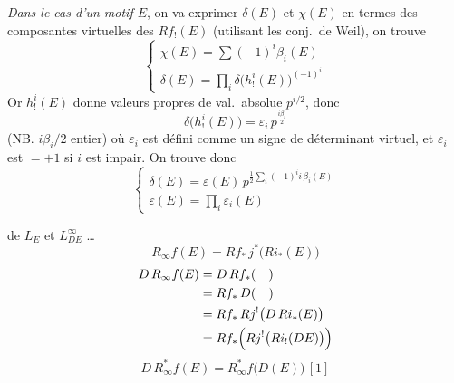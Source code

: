 \documentclass[11pt,a4paper]{article}
\begin{document}
\emph{Dans le cas d'un motif $E$},
on va exprimer $\delta(E)$ et $\chi(E)$ en termes des \struck{\ill{}}
composantes virtuelles des $R f_{!}(E)$ (utilisant les conj.\ de Weil), on
trouve
\[
  \left\lbrace
  \begin{array}{l}
    \chi(E) = \sum (-1)^i \beta_i(E) \\[6pt]
    \delta(E) = \prod_i \delta\bigl(h^i_{!}(E)\bigr)^{(-1)^i}
  \end{array}
  \right.
\]
Or $h^i_{!}(E)$ donne  valeurs propres de val.\ absolue
$p^{i/2}$, donc
\[
  \delta\bigl(h^i_{!}(E)\bigr) = \varepsilon_i\, p^{\frac{i \beta_i}{2}}
\]
(NB. $i\beta_i/2$  entier)
où \struck{\ill{}} $\varepsilon_i$ est défini comme un signe de déterminant
virtuel, et $\varepsilon_i$ est $= +1$ si $i$ est impair. On trouve donc
\[
  \left\lbrace
  \begin{array}{l}
    \delta(E) = \varepsilon(E)\, p^{\frac{1}{2}\sum_i (-1)^i i\, \beta_i(E)} \\[6pt]
    \varepsilon(E) = \prod_i \varepsilon_i(E)
  \end{array}
  \right.
\]

\ill{} \ill{} de $L_E$ et $L^{\infty}_{DE}$ \ldots
{}
\[
  R_{\infty} f(E) = R f_{*}\, j^{*}\bigl(R i_{*}(E)\bigr)
\]
\[
  \begin{aligned}
    D\, R_{\infty} f(E) &= D\, R f_{*}(\quad) \\
      &= R f_{*}\, D(\quad) \\
      &= R f_{*}\, R j^{!}\bigl(D\, R i_{*}(E)\bigr) \\
      &= R f_{*}\Bigl(R j^{!}\bigl(R i_{!}(D E)\bigr)\Bigr)
  \end{aligned}
\]
\[
  \boxed{D\, R^{*}_{\infty} f(E) = R^{*}_{\infty} f\bigl(D(E)\bigr)\, [1]}
\]
\end{document}
